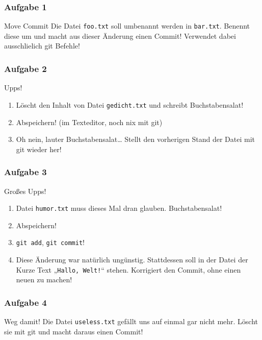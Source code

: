 \documentclass{beamer}
\begin{document}
\begin{frame}
	\frametitle{Aufgabe 1}
	\begin{block}{Move Commit}
		Die Datei \texttt{foo.txt} soll umbenannt werden in \texttt{bar.txt}.
		Benennt diese um und macht aus dieser Änderung einen Commit!
		Verwendet dabei ausschlielich git Befehle!
	\end{block}
\end{frame}

\begin{frame}
	\frametitle{Aufgabe 2}
	\begin{block}{Upps!}
		\begin{enumerate}
			\item Löscht den Inhalt von Datei \texttt{gedicht.txt} und schreibt Buchstabensalat!
			\pause
			\item Abspeichern! (im Texteditor, noch nix mit git)
			\pause
			\item Oh nein, lauter Buchstabensalat… Stellt den vorherigen Stand der Datei mit git wieder her!
		\end{enumerate}
	\end{block}
\end{frame}

\begin{frame}
	\frametitle{Aufgabe 3}
	\begin{block}{Großes Upps!}
		\begin{enumerate}
			\item Datei \texttt{humor.txt} muss dieses Mal dran glauben. Buchstabensalat!
			\pause
			\item Abspeichern!
			\pause
			\item \texttt{git add}, \texttt{git commit}!
			\pause
			\item Diese Änderung war natürlich ungünstig.
				Stattdessen soll in der Datei der Kurze Text „\texttt{Hallo, Welt!}“ stehen.
				Korrigiert den Commit, ohne einen neuen zu machen!
		\end{enumerate}
	\end{block}
\end{frame}

\begin{frame}
	\frametitle{Aufgabe 4}
	\begin{block}{Weg damit!}
		Die Datei \texttt{useless.txt} gefällt uns auf einmal gar nicht mehr.
		Löscht sie mit git und macht daraus einen Commit!
	\end{block}
\end{frame}
\end{document}
